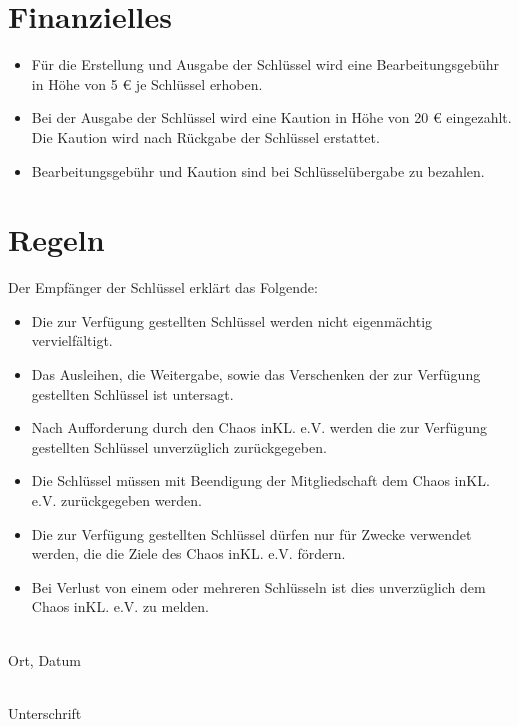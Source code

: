 \documentclass[ngerman,a4wide]{scrartcl}
\newcommand{\bearbeitungsgebuehr}{
	5
}
\newcommand{\kaution}{
	20
}
\begin{document}
\begin{Form}
\section*{Finanzielles}
\begin{itemize}
\setlength{\itemsep}{-2pt}
 \item Für die Erstellung und Ausgabe der Schlüssel wird eine Bearbeitungsgebühr in Höhe von \bearbeitungsgebuehr€ je Schlüssel erhoben.
 \item Bei der Ausgabe der Schlüssel wird eine Kaution in Höhe von \kaution€ eingezahlt. Die Kaution wird nach Rückgabe der Schlüssel erstattet.
 \item Bearbeitungsgebühr und Kaution sind bei Schlüsselübergabe zu bezahlen.
\end{itemize}

\section*{Regeln}
Der Empfänger der Schlüssel erklärt das Folgende:
\begin{itemize}
 \setlength{\itemsep}{-2pt}
 \item Die zur Verfügung gestellten Schlüssel werden nicht eigenmächtig vervielfältigt.
 \item Das Ausleihen, die Weitergabe, sowie das Verschenken der zur Verfügung gestellten Schlüssel ist untersagt.
 \item Nach Aufforderung durch den Chaos inKL. e.V. werden die zur Verfügung gestellten Schlüssel unverzüglich zurückgegeben. 
 \item Die Schlüssel müssen mit Beendigung der Mitgliedschaft dem Chaos inKL. e.V. zurückgegeben werden.
 \item Die zur Verfügung gestellten Schlüssel dürfen nur für Zwecke verwendet werden, die die Ziele des Chaos inKL. e.V. fördern.
 \item Bei Verlust von einem oder mehreren Schlüsseln ist dies unverzüglich dem Chaos inKL. e.V. zu melden.
\end{itemize}

\vspace{2cm}
\begin{minipage}{5cm}
 \dotfill\\
 Ort, Datum
\end{minipage}
\hspace{1cm}
\begin{minipage}{5cm}
 \dotfill\\
 Unterschrift
\end{minipage}


\end{Form}
\end{document}
